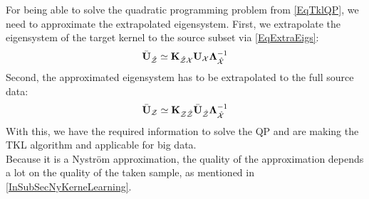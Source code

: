 For being able to solve the quadratic programming problem from \eqref{EqTklQP}, we need to approximate the extrapolated eigensystem.
First, we extrapolate the eigensystem of the target kernel to the source subset via \eqref{EqExtraEigs}:
\begin{equation}
\bar{\mathbf{U}}_\mathcal{\hat{Z}}\simeq\mathbf{K}_{\mathcal{\hat{Z}X}}\mathbf{U}_{\mathcal{X}}\boldsymbol{\Lambda}_\mathcal{\hat{X}}^{-1}
\end{equation}
Second, the approximated eigensystem has to be extrapolated to the full source data:
\begin{equation}
\bar{\mathbf{U}}_\mathcal{Z} \simeq \mathbf{K}_{\mathcal{Z\hat{Z}}}\bar{\mathbf{U}}_\mathcal{\hat{Z}}\boldsymbol{\Lambda}_\mathcal{\hat{X}}^{-1}
\end{equation}
With this, we have the required information to solve the \acl{QP} and are making the \acs{TKL} algorithm and applicable for big data.\cite{Long.2015}\\
Because it is a Nyström approximation, the quality of the approximation depends a lot on the quality of the taken sample, as mentioned in \ref{InSubSecNyKerneLearning}.